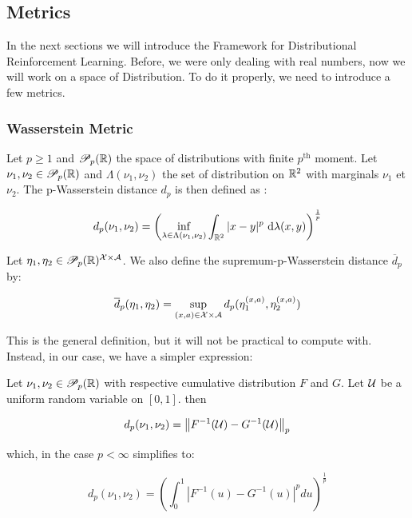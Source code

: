 

\subsection{Metrics}

In the next sections we will introduce the Framework for Distributional Reinforcement Learning. Before, we were only dealing with real numbers, now we will work on a space of Distribution. To do it properly, we need to introduce a few metrics.
\subsubsection*{Wasserstein Metric}

\begin{definition}
    Let $p \geq 1$ and $\mathscr{P}_p(\mathbb{R})$ the space of distributions with finite $p^{\text{th}}$ moment. Let $\nu_1, \nu_2 \in \mathscr{P}_p(\mathbb{R})$ and $\Lambda(\nu_1, \nu_2)$ the set of distribution on $\mathbb{R}^2$ with marginals $\nu_1$ et $\nu_2$. The p-Wasserstein distance $d_p$ is then defined as :

    \[ d_p(\nu_1, \nu_2) = \left( \inf_{\lambda \in \Lambda(\nu_1, \nu_2)} \int_{\mathbb{R}^2} |x-y|^p \ \mathrm{d}\lambda(x,y) \right)^{\frac{1}{p}}\]

    Let $\eta_1, \eta_2 \in \mathscr{P}_p(\mathbb{R})^{\mathcal{X} \times \mathcal{A}}$. We also define the supremum-p-Wasserstein distance $\overline{d}_p$ by:

    \[ \overline{d}_p(\eta_1,\eta_2) = \sup_{(x,a) \in \mathcal{X} \times \mathcal{A}} d_p(\eta_1^{(x,a)}, \eta_2^{(x,a)})\]
\end{definition}

This is the general definition, but it will not be practical to compute with. Instead, in our case, we have a simpler expression:

\begin{lemma}
    Let $\nu_1, \nu_2 \in \mathscr{P}_p(\mathbb{R})$ with respective cumulative distribution $F$ and $G$. Let $\mathcal{U}$ be a uniform random variable on $[0,1]$. then 

    \[ d_p(\nu_1, \nu_2) = \left\lVert F^{-1}(\mathcal{U}) - G^{-1}(\mathcal{U})\right\rVert_p \]

    which, in the case $p < \infty$ simplifies to:

    \[ d_p(\nu_1, \nu_2) = \left(\int_0^1\left|F^{-1}(u) - G^{-1}(u)\right|^p du\right)^{\frac{1}{p}} \]

\end{lemma}

